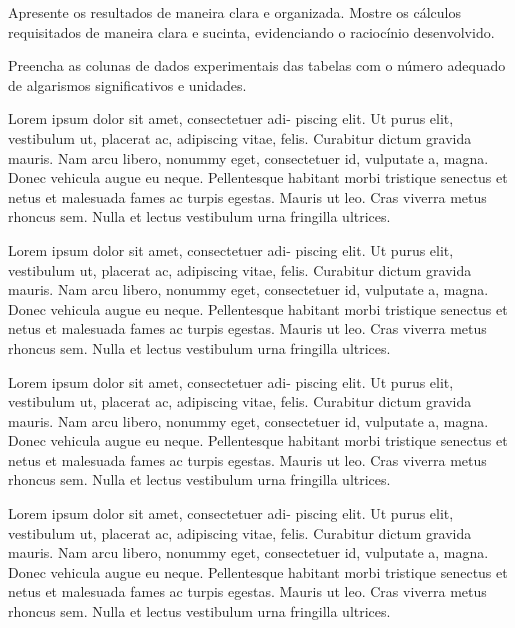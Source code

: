 \begin{question}[type={exam}]{1}
Apresente os resultados de maneira clara e organizada. Mostre os cálculos requisitados de maneira clara e sucinta, evidenciando o raciocínio desenvolvido.
\end{question}

\begin{question}[type={exam}]{1}
Preencha as colunas de dados experimentais das tabelas com o número adequado de algarismos significativos e unidades.
\end{question}

\begin{question}[type={exam}]{2}
Lorem ipsum dolor sit amet, consectetuer adi-
piscing elit. Ut purus elit, vestibulum ut, placerat ac, adipiscing vitae,
felis. Curabitur dictum gravida mauris. Nam arcu libero, nonummy
eget, consectetuer id, vulputate a, magna. Donec vehicula augue
eu neque. Pellentesque habitant morbi tristique senectus et netus
et malesuada fames ac turpis egestas. Mauris ut leo. Cras viverra
metus rhoncus sem. Nulla et lectus vestibulum urna fringilla ultrices.
\end{question}

\begin{question}[type={exam}]{2}
Lorem ipsum dolor sit amet, consectetuer adi-
piscing elit. Ut purus elit, vestibulum ut, placerat ac, adipiscing vitae,
felis. Curabitur dictum gravida mauris. Nam arcu libero, nonummy
eget, consectetuer id, vulputate a, magna. Donec vehicula augue
eu neque. Pellentesque habitant morbi tristique senectus et netus
et malesuada fames ac turpis egestas. Mauris ut leo. Cras viverra
metus rhoncus sem. Nulla et lectus vestibulum urna fringilla ultrices.
\end{question}

\begin{question}[type={exam}]{2}
Lorem ipsum dolor sit amet, consectetuer adi-
piscing elit. Ut purus elit, vestibulum ut, placerat ac, adipiscing vitae,
felis. Curabitur dictum gravida mauris. Nam arcu libero, nonummy
eget, consectetuer id, vulputate a, magna. Donec vehicula augue
eu neque. Pellentesque habitant morbi tristique senectus et netus
et malesuada fames ac turpis egestas. Mauris ut leo. Cras viverra
metus rhoncus sem. Nulla et lectus vestibulum urna fringilla ultrices.
\end{question}

\begin{question}[type={exam}]{2}
Lorem ipsum dolor sit amet, consectetuer adi-
piscing elit. Ut purus elit, vestibulum ut, placerat ac, adipiscing vitae,
felis. Curabitur dictum gravida mauris. Nam arcu libero, nonummy
eget, consectetuer id, vulputate a, magna. Donec vehicula augue
eu neque. Pellentesque habitant morbi tristique senectus et netus
et malesuada fames ac turpis egestas. Mauris ut leo. Cras viverra
metus rhoncus sem. Nulla et lectus vestibulum urna fringilla ultrices.
\end{question}

